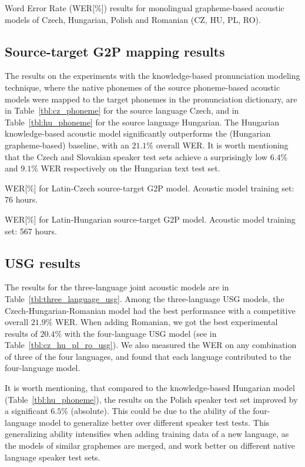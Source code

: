 \documentclass[runningheads,a4paper]{llncs}
\begin{document}
\begin{table}
\centering
\caption{Word Error Rate (WER[\%]) results for monolingual grapheme-based acoustic models of Czech, Hungarian, Polish and Romanian (CZ, HU, PL, RO).}
\label{tbl:cz_hu_pl_ro_grapheme}
\end{table}

\subsection{Source-target G2P mapping results}
The results on the experiments with the knowledge-based pronunciation modeling technique, where the native phonemes of the source phoneme-based acoustic models were mapped to the target phonemes in the pronunciation dictionary, are in Table~\ref{tbl:cz_phoneme} for the source language Czech, and in Table~\ref{tbl:hu_phoneme} for the source language Hungarian.
The Hungarian knowledge-based acoustic model significantly outperforms the (Hungarian grapheme-based) baseline, with an $21.1\%$ overall WER.
It is worth mentioning that the Czech and Slovakian speaker test sets achieve a surprisingly low $6.4\%$ and $9.1\%$ WER respectively on the Hungarian text test set.

\begin{table}
\parbox{.45\linewidth}{
\centering
\caption{WER[\%] for Latin-Czech source-target G2P model. Acoustic model training set: 76 hours.}
\label{tbl:cz_phoneme}
}
\hfill
\parbox{.45\linewidth}{
\centering
\caption{WER[\%] for Latin-Hungarian source-target G2P model. Acoustic model training set: 567 hours.}
\label{tbl:hu_phoneme}
}
\end{table}

\subsection{USG results}
The results for the three-language joint acoustic models are in Table~\ref{tbl:three_language_usg}.
Among the three-language USG models, the Czech-Hungarian-Romanian model had the best performance with a competitive overall $21.9\%$ WER. 
When adding Romanian, we got the best experimental results of $20.4\%$ with the four-language USG model (see in Table~\ref{tbl:cz_hu_pl_ro_usg}).
We also measured the WER on any combination of three of the four languages, and found that each language contributed to the four-language model.

It is worth mentioning, that compared to the knowledge-based Hungarian model (Table~\ref{tbl:hu_phoneme}), the results on the Polish speaker test set improved by a significant $6.5\%$ (absolute).
This could be due to the ability of the four-language model to generalize better over different speaker test tests.
This generalizing ability intensifies when adding training data of a new language, as the models of similar graphemes are merged, and work better on different native language speaker test sets.
\end{document}
